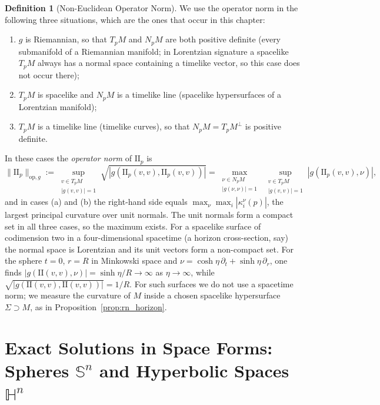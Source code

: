 \documentclass[11pt,reqno]{amsart}
\theoremstyle{definition}
\newtheorem{definition}[theorem]{Definition}
\providecommand{\Hyp}{\mathbb{H}}
\providecommand{\Sph}{\mathbb{S}}
\providecommand{\II}{\mathrm{I\!I}}
\newcommand{\op}{\mathrm{op}}
\numberwithin{equation}{section}
\providecommand{\Hyp}{\mathbb{H}}
\providecommand{\Sph}{\mathbb{S}}
\providecommand{\II}{\mathrm{II}}
\begin{document}
\begin{definition}[Non-Euclidean Operator Norm]
\label{def:opnorm}
We use the operator norm in the following three situations, which are the ones that occur in this chapter:
\begin{enumerate}
    \item[(a)] $g$ is Riemannian, so that $T_pM$ and $N_pM$ are both positive definite (every submanifold of a Riemannian manifold; in Lorentzian signature a spacelike $T_pM$ always has a normal space containing a timelike vector, so this case does not occur there);
    \item[(b)] $T_pM$ is spacelike and $N_pM$ is a timelike line (spacelike hypersurfaces of a Lorentzian manifold);
    \item[(c)] $T_pM$ is a timelike line (timelike curves), so that $N_pM = T_pM^\perp$ is positive definite.
\end{enumerate}
In these cases the \emph{operator norm} of $\II_p$ is
\begin{equation}
\|\II_p\|_{\op, g} := \sup_{\substack{v \in T_pM \\ |g(v,v)| = 1}} \sqrt{|g(\II_p(v,v), \II_p(v,v))|} = \max_{\substack{\nu \in N_pM \\ |g(\nu,\nu)| = 1}} \ \sup_{\substack{v \in T_pM \\ |g(v,v)| = 1}} |g(\II_p(v,v), \nu)|,
\end{equation}
and in cases (a) and (b) the right-hand side equals $\max_\nu \max_i |\kappa_i^\nu(p)|$, the largest principal curvature over unit normals. The unit normals form a compact set in all three cases, so the maximum exists. For a spacelike surface of codimension two in a four-dimensional spacetime (a horizon cross-section, say) the normal space is Lorentzian and its unit vectors form a non-compact set. For the sphere $t = 0$, $r = R$ in Minkowski space and $\nu = \cosh\eta\, \partial_t + \sinh\eta\, \partial_r$, one finds $|g(\II(v,v),\nu)| = \sinh\eta/R \to \infty$ as $\eta \to \infty$, while $\sqrt{|g(\II(v,v),\II(v,v))|} = 1/R$. For such surfaces we do not use a spacetime norm; we measure the curvature of $M$ inside a chosen spacelike hypersurface $\Sigma \supset M$, as in Proposition~\ref{prop:rn_horizon}.
\end{definition}

\section{Exact Solutions in Space Forms: Spheres \texorpdfstring{$\Sph^n$}{S\textasciicircum n} and Hyperbolic Spaces \texorpdfstring{$\Hyp^n$}{H\textasciicircum n}}
\end{document}
